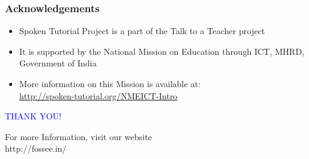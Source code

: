 \documentclass[17pt]{beamer}
\begin{document}
\begin{frame}
	\frametitle{Acknowledgements}
	\begin{itemize}
		\item Spoken Tutorial Project is a part of the Talk to a Teacher  project 
		\item It is supported by the National Mission on Education through  ICT, MHRD, Government of India 
		\item More information on this Mission is available at: \\{\color{blue}\url{http://spoken-tutorial.org/NMEICT-Intro}}
	\end{itemize}
\end{frame}
\begin{frame}
	
	\begin{block}{}
		\begin{center}
			\textcolor{blue}{\Large THANK YOU!} 
		\end{center}
	\end{block}
	\begin{block}{}
		\begin{center}
			For more Information, visit our website\\
			{http://fossee.in/}
		\end{center}  
	\end{block}
\end{frame}
\end{document}
